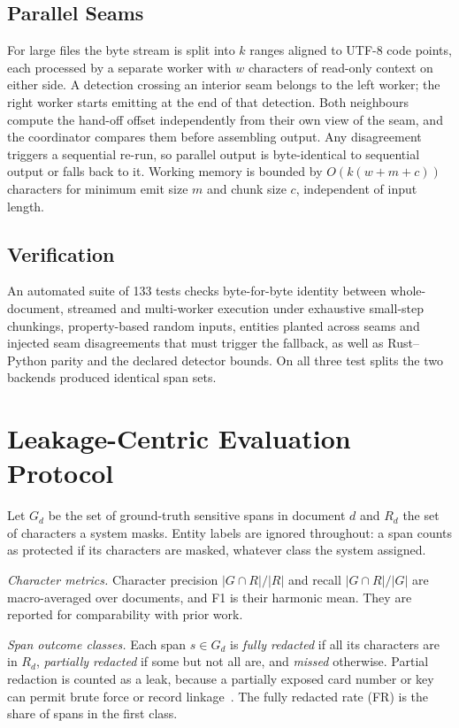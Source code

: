 \documentclass[conference]{IEEEtran}
\begin{document}
\subsection{Parallel Seams}
For large files the byte stream is split into $k$ ranges aligned to UTF-8 code
points, each processed by a separate worker with $w$ characters of read-only
context on either side. A detection crossing an interior seam belongs to the
left worker; the right worker starts emitting at the end of that detection.
Both neighbours compute the hand-off offset independently from their own view
of the seam, and the coordinator compares them before assembling output. Any
disagreement triggers a sequential re-run, so parallel output is byte-identical
to sequential output or falls back to it. Working memory is bounded by
$O(k(w+m+c))$ characters for minimum emit size $m$ and chunk size $c$,
independent of input length.

\subsection{Verification}
An automated suite of 133 tests checks byte-for-byte identity between
whole-document, streamed and multi-worker execution under exhaustive
small-step chunkings, property-based random inputs, entities planted across
seams and injected seam disagreements that must trigger the fallback, as well
as Rust--Python parity and the declared detector bounds. On all three test
splits the two backends produced identical span sets.

\section{Leakage-Centric Evaluation Protocol}
\label{sec:protocol}

Let $G_d$ be the set of ground-truth sensitive spans in document $d$ and $R_d$
the set of characters a system masks. Entity labels are ignored throughout: a
span counts as protected if its characters are masked, whatever class the
system assigned.

\textit{Character metrics.} Character precision $|G\cap R|/|R|$ and recall
$|G\cap R|/|G|$ are macro-averaged over documents, and F1 is their harmonic
mean. They are reported for comparability with prior work.

\textit{Span outcome classes.} Each span $s\in G_d$ is \emph{fully redacted}
if all its characters are in $R_d$, \emph{partially redacted} if some but not
all are, and \emph{missed} otherwise. Partial redaction is counted as a leak,
because a partially exposed card number or key can permit brute force or
record linkage~\cite{sweeney2002kanonymity}. The fully redacted rate (FR) is
the share of spans in the first class.
\end{document}
